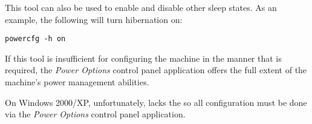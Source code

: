 This tool can also be used to enable and disable other sleep states.  As 
an example, the following will turn hibernation on:

\begin{verbatim}
powercfg -h on
\end{verbatim}

If this tool is insufficient for configuring the machine in the manner that 
is required, the \textit{Power Options} control panel application offers
the full extent of the machine's power management abilities.

On Windows 2000/XP, unfortunately, lacks the  so all 
configuration must be done via the \textit{Power Options} control panel 
application.

